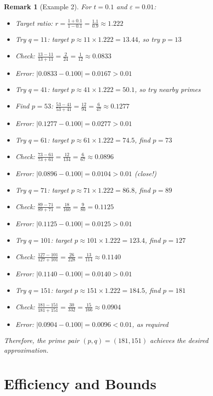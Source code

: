 \documentclass[11pt]{article}
\newtheorem{remark}{Remark}
\begin{document}
\begin{remark}[Example 2]
For $t = 0.1$ and $\varepsilon = 0.01$:
\begin{itemize}
\item Target ratio: $r = \frac{1 + 0.1}{1 - 0.1} = \frac{1.1}{0.9} \approx 1.222$
\item Try $q = 11$: target $p \approx 11 \times 1.222 = 13.44$, so try $p = 13$
\item Check: $\frac{13-11}{13+11} = \frac{2}{24} = \frac{1}{12} \approx 0.0833$
\item Error: $|0.0833 - 0.100| = 0.0167 > 0.01$
\item Try $q = 41$: target $p \approx 41 \times 1.222 = 50.1$, so try nearby primes
\item Find $p = 53$: $\frac{53-41}{53+41} = \frac{12}{94} = \frac{6}{47} \approx 0.1277$
\item Error: $|0.1277 - 0.100| = 0.0277 > 0.01$
\item Try $q = 61$: target $p \approx 61 \times 1.222 = 74.5$, find $p = 73$
\item Check: $\frac{73-61}{73+61} = \frac{12}{134} = \frac{6}{67} \approx 0.0896$
\item Error: $|0.0896 - 0.100| = 0.0104 > 0.01$ (close!)
\item Try $q = 71$: target $p \approx 71 \times 1.222 = 86.8$, find $p = 89$
\item Check: $\frac{89-71}{89+71} = \frac{18}{160} = \frac{9}{80} = 0.1125$
\item Error: $|0.1125 - 0.100| = 0.0125 > 0.01$
\item Try $q = 101$: target $p \approx 101 \times 1.222 = 123.4$, find $p = 127$
\item Check: $\frac{127-101}{127+101} = \frac{26}{228} = \frac{13}{114} \approx 0.1140$
\item Error: $|0.1140 - 0.100| = 0.0140 > 0.01$
\item Try $q = 151$: target $p \approx 151 \times 1.222 = 184.5$, find $p = 181$
\item Check: $\frac{181-151}{181+151} = \frac{30}{332} = \frac{15}{166} \approx 0.0904$
\item Error: $|0.0904 - 0.100| = 0.0096 < 0.01$, as required
\end{itemize}
Therefore, the prime pair $(p,q) = (181, 151)$ achieves the desired approximation.
\end{remark}

\section{Efficiency and Bounds}
\end{document}
